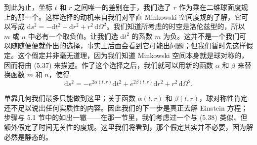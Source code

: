 到此为止，坐标 $t$ 和 $r$ 之间唯一的差别在于，我们选了 $r$ 作为乘在二维球面度规上的那一个。这样选择的动机来自我们对平直 Minkowski 空间度规的了解，它可以写成 $\mathrm{d}s^2 = -\mathrm{d}t^2 + \mathrm{d}r^2 + r^2\,\mathrm{d}\Omega^2$。我们知道所考虑的时空是洛伦兹型的，所以 $m$ 或 $n$ 中必有一个取负值。让我们选 $\mathrm{d}t^2$ 的系数 $m$ 为负。这并不是一个我们可以随随便便就作出的选择，事实上后面会看到它可能出问题；但我们暂时先这样假定。这个假定并非毫无道理，因为我们知道 Minkowski 空间本身就是球对称的，因而将由 (5.37) 来描述。作了这个选择之后，我们就可以用新的函数 $\alpha$ 和 $\beta$ 来替换函数 $m$ 和 $n$，使得
\begin{equation*}
\mathrm{d}s^2 = -e^{2\alpha(t, r)}\mathrm{d}t^2 + e^{2\beta(t, r)}\mathrm{d}r^2 + r^2\,\mathrm{d}\Omega^2.
\tag{5.38}
\end{equation*}

单靠几何我们最多只能做到这里；关于函数 $\alpha(t, r)$ 和 $\beta(t, r)$，球对称性肯定还不足以说出任何实质性的内容。因此我们的下一步是真正去解 Einstein 方程；步骤与
5.1 节中的如出一辙——在那一节里，我们考虑过一个与 (5.38) 类似、但额外假定了时间无关性的度规。这里我们将看到，那个假定其实并不必要，因为解必然是静态的。

